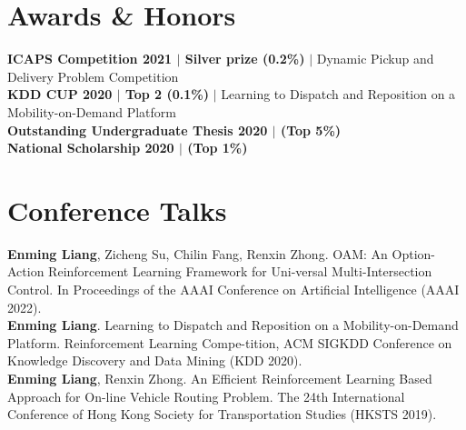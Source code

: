 \documentclass[letterpaper,11pt]{article}
\newcommand{\resumeSubHeadingListStart}{\begin{itemize}[leftmargin=0.15in, label={}]}
\newcommand{\resumeSubHeadingListEnd}{\end{itemize}}
\begin{document}
\section{Awards \& Honors}
  \vspace{2pt}
  \resumeSubHeadingListStart
    \small{\item{
        \textbf{ICAPS Competition 2021 $|$ Silver prize (0.2\%)}{ $|$ Dynamic Pickup and Delivery Problem Competition} \\ \vspace{3pt}
        \textbf{KDD CUP 2020 $|$ Top 2 (0.1\%)}{ $|$ Learning to Dispatch and Reposition on a Mobility-on-Demand Platform} \\ \vspace{3pt}
        \textbf{Outstanding Undergraduate Thesis 2020 $|$ (Top 5\%)}{} \\ \vspace{3pt}
        \textbf{National Scholarship 2020 $|$ (Top 1\%)}{} \\ \vspace{3pt}
    }}
  \resumeSubHeadingListEnd




\section{Conference Talks}
\vspace{2pt}
\resumeSubHeadingListStart
  \small{\item{
    \textbf{Enming Liang}, Zicheng Su, Chilin Fang, Renxin Zhong. OAM: An Option-Action Reinforcement Learning Framework for Uni-versal Multi-Intersection Control. In Proceedings of the AAAI Conference on Artificial Intelligence (AAAI 2022).
    \\ \vspace{3pt}
    \textbf{Enming Liang}. Learning to Dispatch and Reposition on a Mobility-on-Demand Platform.  Reinforcement Learning Compe-tition, ACM SIGKDD Conference on Knowledge Discovery and Data Mining (KDD 2020).
    \\ \vspace{3pt}
    \textbf{Enming Liang}, Renxin Zhong. An Efficient Reinforcement Learning Based Approach for On-line Vehicle Routing Problem. The 24th International Conference of Hong Kong Society for Transportation Studies (HKSTS 2019).
  }}
\resumeSubHeadingListEnd



\end{document}
